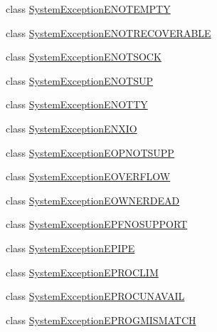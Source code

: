 \begin{DoxyCompactItemize}
\item 
class \hyperlink{class_communication_1_1_exception_1_1_system_exception_e_n_o_t_e_m_p_t_y}{System\+Exception\+E\+N\+O\+T\+E\+M\+P\+T\+Y}
\item 
class \hyperlink{class_communication_1_1_exception_1_1_system_exception_e_n_o_t_r_e_c_o_v_e_r_a_b_l_e}{System\+Exception\+E\+N\+O\+T\+R\+E\+C\+O\+V\+E\+R\+A\+B\+L\+E}
\item 
class \hyperlink{class_communication_1_1_exception_1_1_system_exception_e_n_o_t_s_o_c_k}{System\+Exception\+E\+N\+O\+T\+S\+O\+C\+K}
\item 
class \hyperlink{class_communication_1_1_exception_1_1_system_exception_e_n_o_t_s_u_p}{System\+Exception\+E\+N\+O\+T\+S\+U\+P}
\item 
class \hyperlink{class_communication_1_1_exception_1_1_system_exception_e_n_o_t_t_y}{System\+Exception\+E\+N\+O\+T\+T\+Y}
\item 
class \hyperlink{class_communication_1_1_exception_1_1_system_exception_e_n_x_i_o}{System\+Exception\+E\+N\+X\+I\+O}
\item 
class \hyperlink{class_communication_1_1_exception_1_1_system_exception_e_o_p_n_o_t_s_u_p_p}{System\+Exception\+E\+O\+P\+N\+O\+T\+S\+U\+P\+P}
\item 
class \hyperlink{class_communication_1_1_exception_1_1_system_exception_e_o_v_e_r_f_l_o_w}{System\+Exception\+E\+O\+V\+E\+R\+F\+L\+O\+W}
\item 
class \hyperlink{class_communication_1_1_exception_1_1_system_exception_e_o_w_n_e_r_d_e_a_d}{System\+Exception\+E\+O\+W\+N\+E\+R\+D\+E\+A\+D}
\item 
class \hyperlink{class_communication_1_1_exception_1_1_system_exception_e_p_f_n_o_s_u_p_p_o_r_t}{System\+Exception\+E\+P\+F\+N\+O\+S\+U\+P\+P\+O\+R\+T}
\item 
class \hyperlink{class_communication_1_1_exception_1_1_system_exception_e_p_i_p_e}{System\+Exception\+E\+P\+I\+P\+E}
\item 
class \hyperlink{class_communication_1_1_exception_1_1_system_exception_e_p_r_o_c_l_i_m}{System\+Exception\+E\+P\+R\+O\+C\+L\+I\+M}
\item 
class \hyperlink{class_communication_1_1_exception_1_1_system_exception_e_p_r_o_c_u_n_a_v_a_i_l}{System\+Exception\+E\+P\+R\+O\+C\+U\+N\+A\+V\+A\+I\+L}
\item 
class \hyperlink{class_communication_1_1_exception_1_1_system_exception_e_p_r_o_g_m_i_s_m_a_t_c_h}{System\+Exception\+E\+P\+R\+O\+G\+M\+I\+S\+M\+A\+T\+C\+H}
\item 

\end{DoxyCompactItemize}
